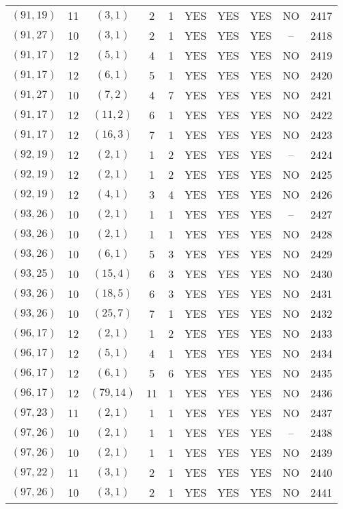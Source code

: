 \begin{longtable}{|c|c|c|c|c|c|c|c|c|c|}
$(91, 19)$ & 11 & $(3, 1)$ & 2 & 1 & YES & YES & YES & NO & 2417\\
$(91, 27)$ & 10 & $(3, 1)$ & 2 & 1 & YES & YES & YES & -- & 2418\\
$(91, 17)$ & 12 & $(5, 1)$ & 4 & 1 & YES & YES & YES & NO & 2419\\
$(91, 17)$ & 12 & $(6, 1)$ & 5 & 1 & YES & YES & YES & NO & 2420\\
$(91, 27)$ & 10 & $(7, 2)$ & 4 & 7 & YES & YES & YES & NO & 2421\\
$(91, 17)$ & 12 & $(11, 2)$ & 6 & 1 & YES & YES & YES & NO & 2422\\
$(91, 17)$ & 12 & $(16, 3)$ & 7 & 1 & YES & YES & YES & NO & 2423\\
$(92, 19)$ & 12 & $(2, 1)$ & 1 & 2 & YES & YES & YES & -- & 2424\\
$(92, 19)$ & 12 & $(2, 1)$ & 1 & 2 & YES & YES & YES & NO & 2425\\
$(92, 19)$ & 12 & $(4, 1)$ & 3 & 4 & YES & YES & YES & NO & 2426\\
$(93, 26)$ & 10 & $(2, 1)$ & 1 & 1 & YES & YES & YES & -- & 2427\\
$(93, 26)$ & 10 & $(2, 1)$ & 1 & 1 & YES & YES & YES & NO & 2428\\
$(93, 26)$ & 10 & $(6, 1)$ & 5 & 3 & YES & YES & YES & NO & 2429\\
$(93, 25)$ & 10 & $(15, 4)$ & 6 & 3 & YES & YES & YES & NO & 2430\\
$(93, 26)$ & 10 & $(18, 5)$ & 6 & 3 & YES & YES & YES & NO & 2431\\
$(93, 26)$ & 10 & $(25, 7)$ & 7 & 1 & YES & YES & YES & NO & 2432\\
$(96, 17)$ & 12 & $(2, 1)$ & 1 & 2 & YES & YES & YES & NO & 2433\\
$(96, 17)$ & 12 & $(5, 1)$ & 4 & 1 & YES & YES & YES & NO & 2434\\
$(96, 17)$ & 12 & $(6, 1)$ & 5 & 6 & YES & YES & YES & NO & 2435\\
$(96, 17)$ & 12 & $(79, 14)$ & 11 & 1 & YES & YES & YES & NO & 2436\\
$(97, 23)$ & 11 & $(2, 1)$ & 1 & 1 & YES & YES & YES & NO & 2437\\
$(97, 26)$ & 10 & $(2, 1)$ & 1 & 1 & YES & YES & YES & -- & 2438\\
$(97, 26)$ & 10 & $(2, 1)$ & 1 & 1 & YES & YES & YES & NO & 2439\\
$(97, 22)$ & 11 & $(3, 1)$ & 2 & 1 & YES & YES & YES & NO & 2440\\
$(97, 26)$ & 10 & $(3, 1)$ & 2 & 1 & YES & YES & YES & NO & 2441\\

\end{longtable}
